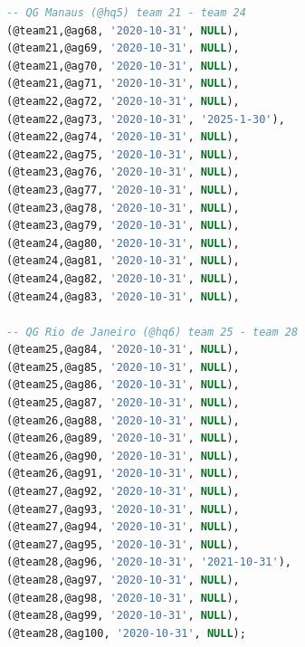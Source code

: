 \documentclass[12pt,a4paper]{report}
\begin{document}
\begin{lstlisting}[language=SQL, caption=population.sql]
-- QG Manaus (@hq5) team 21 - team 24
(@team21,@ag68, '2020-10-31', NULL),
(@team21,@ag69, '2020-10-31', NULL),
(@team21,@ag70, '2020-10-31', NULL),
(@team21,@ag71, '2020-10-31', NULL),
(@team22,@ag72, '2020-10-31', NULL),
(@team22,@ag73, '2020-10-31', '2025-1-30'),
(@team22,@ag74, '2020-10-31', NULL),
(@team22,@ag75, '2020-10-31', NULL),
(@team23,@ag76, '2020-10-31', NULL),
(@team23,@ag77, '2020-10-31', NULL),
(@team23,@ag78, '2020-10-31', NULL),
(@team23,@ag79, '2020-10-31', NULL),
(@team24,@ag80, '2020-10-31', NULL),
(@team24,@ag81, '2020-10-31', NULL),
(@team24,@ag82, '2020-10-31', NULL),
(@team24,@ag83, '2020-10-31', NULL),

-- QG Rio de Janeiro (@hq6) team 25 - team 28
(@team25,@ag84, '2020-10-31', NULL),
(@team25,@ag85, '2020-10-31', NULL),
(@team25,@ag86, '2020-10-31', NULL),
(@team25,@ag87, '2020-10-31', NULL),
(@team26,@ag88, '2020-10-31', NULL),
(@team26,@ag89, '2020-10-31', NULL),
(@team26,@ag90, '2020-10-31', NULL),
(@team26,@ag91, '2020-10-31', NULL),
(@team27,@ag92, '2020-10-31', NULL),
(@team27,@ag93, '2020-10-31', NULL),
(@team27,@ag94, '2020-10-31', NULL),
(@team27,@ag95, '2020-10-31', NULL),
(@team28,@ag96, '2020-10-31', '2021-10-31'),
(@team28,@ag97, '2020-10-31', NULL),
(@team28,@ag98, '2020-10-31', NULL),
(@team28,@ag99, '2020-10-31', NULL),
(@team28,@ag100, '2020-10-31', NULL);



\end{lstlisting}
\end{document}
